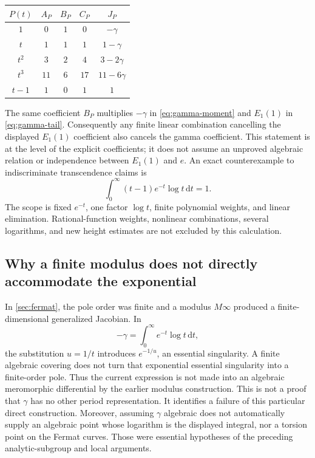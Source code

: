 \documentclass[11pt,a4paper]{article}
\numberwithin{equation}{section}
\theoremstyle{definition}
\theoremstyle{remark}
\newcommand{\dd}{\,\mathrm d}
\begin{document}
\begin{center}
\begin{tabular}{@{}ccccc@{}}
\toprule
$P(t)$ & $A_P$ & $B_P$ & $C_P$ & $J_P$\\
\midrule
$1$ & $0$ & $1$ & $0$ & $-\gamma$\\
$t$ & $1$ & $1$ & $1$ & $1-\gamma$\\
$t^2$ & $3$ & $2$ & $4$ & $3-2\gamma$\\
$t^3$ & $11$ & $6$ & $17$ & $11-6\gamma$\\
$t-1$ & $1$ & $0$ & $1$ & $1$\\
\bottomrule
\end{tabular}
\end{center}
The same coefficient $B_P$ multiplies $-\gamma$ in
\eqref{eq:gamma-moment} and $E_1(1)$ in \eqref{eq:gamma-tail}.
Consequently any finite linear combination cancelling the displayed
$E_1(1)$ coefficient also cancels the gamma coefficient. This statement
is at the level of the explicit coefficients; it does not assume an
unproved algebraic relation or independence between $E_1(1)$ and $e$.
An exact counterexample to indiscriminate transcendence claims is
\begin{equation}\label{eq:gamma-algebraic-counterexample}
 \int_0^\infty(t-1)e^{-t}\log t\dd t=1.
\end{equation}
The scope is fixed $e^{-t}$, one factor $\log t$, finite polynomial
weights, and linear elimination. Rational-function weights, nonlinear
combinations, several logarithms, and new height estimates are not
excluded by this calculation.

\subsection{Why a finite modulus does not directly accommodate the exponential}
In \cref{sec:fermat}, the pole order was finite and a modulus $M\infty$
produced a finite-dimensional generalized Jacobian. In
\[
 -\gamma=\int_0^\infty e^{-t}\log t\dd t,
\]
the substitution $u=1/t$ introduces $e^{-1/u}$, an essential singularity.
A finite algebraic covering does not turn that exponential essential
singularity into a finite-order pole. Thus the current expression is
not made into an algebraic meromorphic differential by the earlier
modulus construction.
This is not a proof that $\gamma$ has no other period representation.
It identifies a failure of this particular direct construction. Moreover,
assuming $\gamma$ algebraic does not automatically supply an algebraic
point whose logarithm is the displayed integral, nor a torsion point on
the Fermat curves. Those were essential hypotheses of the preceding
analytic-subgroup and local arguments.
\end{document}
